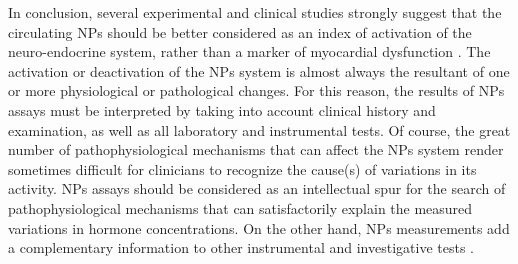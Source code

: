 \documentclass[14pt,a4paper,onecolumn]{extarticle}
\begin{document}
In conclusion, several  experimental and clinical studies strongly suggest that the circulating NPs should be better considered as an index of activation of the neuro-endocrine system, rather than a marker of myocardial dysfunction \citep{bib3298}. The activation or deactivation of the NPs system is almost always the resultant of one or more physiological or pathological changes. For this reason, the results of NPs assays must be interpreted by taking into account clinical history and examination, as well as all laboratory and instrumental tests. Of course, the great number of pathophysiological mechanisms that can affect the NPs system render sometimes difficult for clinicians to recognize the cause(s) of variations in its activity. NPs assays should be considered as an intellectual spur for the search of pathophysiological mechanisms that can satisfactorily explain the measured variations in hormone concentrations. On the other hand, NPs measurements add a complementary information to other instrumental and investigative tests \citep{bib3296}.






\end{document}
